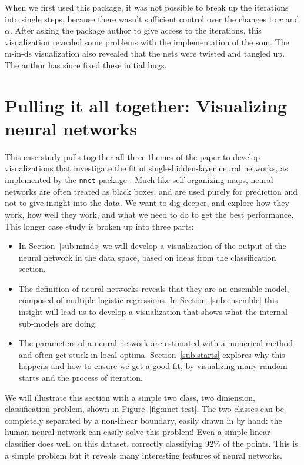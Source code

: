 \documentclass[preprint]{imsart}
\begin{document}
When we first used this package, it was not possible to break up the iterations into single steps, because there wasn't sufficient control over the changes to $r$ and $\alpha$.   After asking the package author to give access to the iterations, this visualization revealed some problems with the implementation of the {\sc som}.   The m-in-ds visualization also revealed that the nets were twisted and tangled up.  The author has since fixed these initial bugs.

\section{Pulling it all together: Visualizing neural networks}
\label{sec:nnet}

This case study pulls together all three themes of the paper to develop visualizations that investigate the fit of single-hidden-layer neural networks, as implemented by the {\tt nnet} package \citep{mass}.  Much like self organizing maps, neural networks are often treated as black boxes, and are used purely for prediction and not to give insight into the data. We want to dig deeper, and explore how they work, how well they work, and what we need to do to get the best performance.  This longer case study is broken up into three parts:

\begin{itemize} \itemsep 0in
  \item  In Section~\ref{sub:minds} we will develop a visualization of the output of the neural network in the data space, based on ideas from the classification section.

  \item The definition of neural networks reveals that they are an ensemble model, composed of multiple logistic regressions. In Section~\ref{sub:ensemble} this insight will lead us to develop a visualization that shows what the internal sub-models are doing.

  \item The parameters of a neural network are estimated with a numerical method and often get stuck in local optima.  Section~\ref{sub:starts} explores why this happens and how to ensure we get a good fit, by visualizing many random starts and the process of iteration.

\end{itemize}

We will illustrate this section with a simple two class, two dimension, classification problem, shown in Figure~\ref{fig:nnet-test}. The two classes can be completely separated by a non-linear boundary, easily drawn in by hand: the human neural network can easily solve this problem! Even a simple linear classifier does well on this dataset, correctly classifying 92\% of the points. This is a simple problem but it reveals many interesting features of neural networks.
\end{document}
